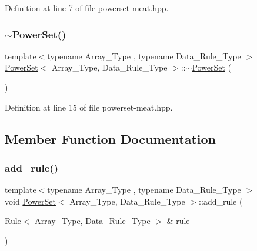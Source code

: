 Definition at line 7 of file powerset-\/meat.\+hpp.

\mbox{\label{class_power_set_a89a176c9517e81a066adffad3c46aba5}} 
\subsubsection{\texorpdfstring{$\sim$\+Power\+Set()}{~PowerSet()}}
{\footnotesize\ttfamily template$<$typename Array\+\_\+\+Type , typename Data\+\_\+\+Rule\+\_\+\+Type $>$ \\
\hyperlink{class_power_set}{Power\+Set}$<$ Array\+\_\+\+Type, Data\+\_\+\+Rule\+\_\+\+Type $>$\+::$\sim$\hyperlink{class_power_set}{Power\+Set} (\begin{DoxyParamCaption}{ }\end{DoxyParamCaption})\hspace{0.3cm}{\ttfamily [inline]}}



Definition at line 15 of file powerset-\/meat.\+hpp.



\subsection{Member Function Documentation}
\mbox{\label{class_power_set_a00ee318a40da91bcf0bff79bf71454ab}} 
\subsubsection{\texorpdfstring{add\+\_\+rule()}{add\_rule()}\hspace{0.1cm}{\footnotesize\ttfamily [1/3]}}
{\footnotesize\ttfamily template$<$typename Array\+\_\+\+Type , typename Data\+\_\+\+Rule\+\_\+\+Type $>$ \\
void \hyperlink{class_power_set}{Power\+Set}$<$ Array\+\_\+\+Type, Data\+\_\+\+Rule\+\_\+\+Type $>$\+::add\+\_\+rule (\begin{DoxyParamCaption}\item[{\hyperlink{class_rule}{Rule}$<$ Array\+\_\+\+Type, Data\+\_\+\+Rule\+\_\+\+Type $>$ \&}]{rule }\end{DoxyParamCaption})\hspace{0.3cm}{\ttfamily [inline]}}



